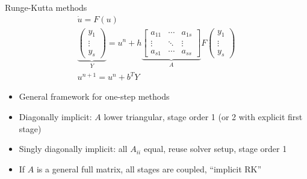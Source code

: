 \documentclass{beamer}
\begin{document}
\begin{frame}{Runge-Kutta methods}
  \begin{gather*}
    \dot u = F(u) \\
    \underbrace{
    \begin{pmatrix}
      y_1 \\
      \vdots \\
      y_s
    \end{pmatrix}}_Y =
    u^{n} + h
    \underbrace{
    \begin{bmatrix}
      a_{11} & \dotsb & a_{1s} \\
      \vdots & \ddots & \vdots \\
      a_{s1} & \dotsb & a_{ss}
    \end{bmatrix}}_A
    F
    \begin{pmatrix}
      y_1 \\
      \vdots \\
      y_s
    \end{pmatrix} \\
    u^{n+1} = u^n + b^T Y
  \end{gather*}
  \begin{itemize}
  \item General framework for one-step methods
  \item Diagonally implicit: $A$ lower triangular, stage order 1 (or 2 with explicit first stage)
  \item Singly diagonally implicit: all $A_{ii}$ equal, reuse solver setup, stage order 1
  \item If $A$ is a general full matrix, all stages are coupled, ``implicit RK''
  \end{itemize}
\end{frame}
\end{document}

